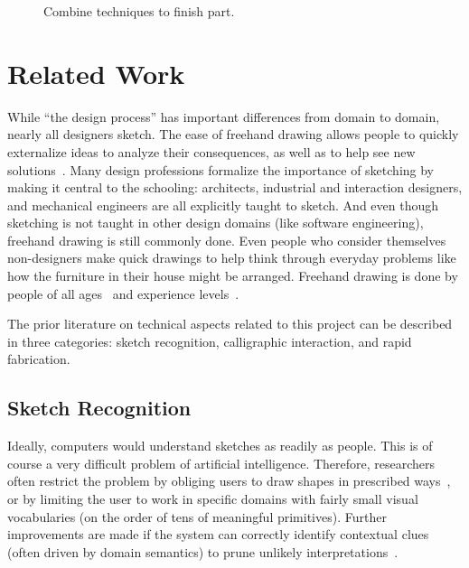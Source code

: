 \documentclass[11pt]{article}
\begin{document}
\begin{figure}[] 
\centering
{} 
\caption{Combine techniques to finish part.}
\label{fig:ix-final-steps}
\end{figure}
\restoregeometry
\newpage
\onecolumn
\doublespacing
\section{Related Work}

While ``the design process'' has important differences from domain to
domain, nearly all designers sketch. The ease of freehand drawing
allows people to quickly externalize ideas to analyze their
consequences, as well as to help see new
solutions~\cite{lawson-designers-think,goldschmidt-dialectics}. Many
design professions formalize the importance of sketching by making it
central to the schooling: architects, industrial and interaction
designers, and mechanical engineers are all explicitly taught to
sketch. And even though sketching is not taught in other design
domains (like software engineering), freehand drawing is still
commonly done. Even people who consider themselves non-designers make
quick drawings to help think through everyday problems like how the
furniture in their house might be arranged. Freehand drawing is done
by people of all ages~\cite{goldschmidt-backtalk} and experience
levels~\cite{suwa-analysis-students}.

The prior literature on technical aspects related to this project can
be described in three categories: sketch recognition, calligraphic
interaction, and rapid fabrication.

\subsection{Sketch Recognition}

Ideally, computers would understand sketches as readily as
people. This is of course a very difficult problem of artificial
intelligence. Therefore, researchers often restrict the problem by
obliging users to draw shapes in prescribed
ways~\cite{rubine-recognizer,wobbrock-dollar}, or by limiting the user
to work in specific domains with fairly small visual vocabularies (on
the order of tens of meaningful primitives). Further improvements are
made if the system can correctly identify contextual clues (often
driven by domain semantics) to prune unlikely
interpretations~\cite{gross-ecn-uist,do-phd-thesis}.
\end{document}
